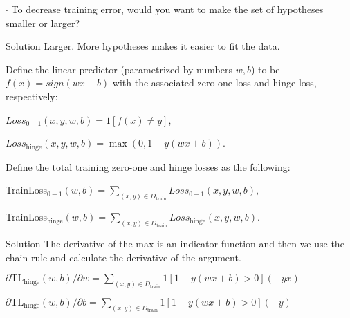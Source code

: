\documentclass[4pt,landscape]{article}
\begin{document}
\begin{multicols*}{4}
{$\cdot$ To decrease training error, would you want to make the set of hypotheses
smaller or larger?}\par
{{\color{purple}Solution} Larger. More hypotheses makes it easier to fit the data.}\par
{\color{purple}\hrulefill}\par
{\tiny Define the linear predictor (parametrized by numbers $w, b$) to be
$f(x) = sign(wx + b)$ with the associated zero-one loss and hinge loss, respectively:}\par
{\tiny $Loss_{0-1}(x, y, w, b) = 1[f(x) \ne y]$,}\par
{\tiny $Loss_{\text{hinge}}(x, y, w, b) = \max(0, 1 − y(wx + b))$.}\par
{Define the total training zero-one and hinge losses as the following:}\par
{\tiny TrainLoss$_{0-1}(w, b) = \displaystyle\sum_{(x,y)\in D_{\text{train}}}Loss_{0-1}(x, y, w, b),$}\par
{\tiny TrainLoss$_{\text{hinge}}(w, b) = \displaystyle\sum_{(x,y)\in D_{\text{train}}}Loss_{\text{hinge}}(x, y, w, b).$}\par
{{\color{purple}Solution }The derivative of the max is an indicator function and then we use the chain rule and calculate the derivative of the argument.}\par
{\tiny ${\partial\text{TL}_{\text{hinge}}(w, b)}/{\partial w} =\displaystyle\sum_{(x,y)\in D_{\text{train}}}1[1 − y(wx + b) > 0](−yx)$}\par
{\tiny ${\partial\text{TL}_{\text{hinge}}(w, b)}/{\partial b} =\displaystyle\sum_{(x,y)\in D_{\text{train}}}1[1 − y(wx + b) > 0](−y)$}\par
\end{multicols*}
\end{document}
